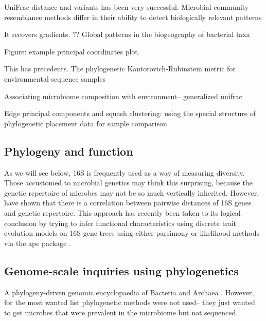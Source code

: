 \documentclass{amsart}
\begin{document}
UniFrac distance and variants has been very successful.
\citep{LozuponeKnightUniFrac05}
\citep{LozuponeEaWeightedUnifrac07}
\citep{kuczynski2010microbial} Microbial community resemblance methods differ in their ability to detect biologically relevant patterns

It recovers gradients.
\citep{nemergut2011global}
?? Global patterns in the biogeography of bacterial taxa

Figure: example principal coordinates plot.

This has precedents.
\citep{evans2012phylogenetic}
The phylogenetic Kantorovich-Rubinstein metric for environmental sequence samples

\citep{BikEaMicrobiotaStomach06}
\citep{PurdomAnalyzingDataGraphs08}

\citep{chen2012associating}
Associating microbiome composition with environment-- generalized unifrac

\citep{matsen2013edge}
Edge principal components and squash clustering: using the special structure of phylogenetic placement data for sample comparison



\subsection{Phylogeny and function}

As we will see below, 16S is frequently used as a way of measuring diversity.
Those accustomed to microbial genetics may think this surprising, because the genetic repertoire of microbes may not be so much vertically inherited.
However, \citep{zaneveld2010ribosomal} have shown that there is a correlation between pairwise distances of 16S genes and genetic repertoire.
This approach has recently been taken to its logical conclusion by trying to infer functional characteristics using discrete trait evolution models on 16S gene trees \citep{langille2013predictive} using either parsimony \citep{kluge1969quantitative} or likelihood \citep{pagel1994detecting} methods via the ape package \citep{paradis2004ape}.


\subsection{Genome-scale inquiries using phylogenetics}

A phylogeny-driven genomic encyclopaedia of Bacteria and Archaea \citep{wu2009phylogeny}.
However, for the most wanted \cite{fodor2012most} list phylogenetic methods were not used-- they just wanted to get microbes that were prevalent in the microbiome but not sequenced.
\end{document}
